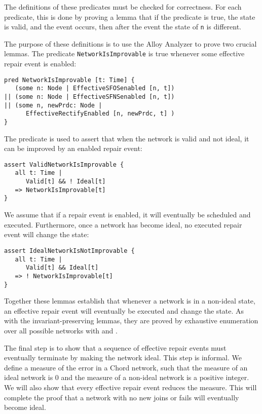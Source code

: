 \documentclass[conference]{IEEEtran}
\begin{document}
The definitions of these predicates must be checked for correctness.
For each predicate, this is done by proving a lemma that if the
predicate is true, the state is valid, and the event occurs, then
after the event the state of {\tt n} is different.

The purpose of these definitions is to use the Alloy Analyzer to
prove two crucial lemmas.
The predicate 
\small
{\tt NetworkIsImprovable}
\normalsize
is true whenever some effective
repair event is enabled:
\small
\begin{verbatim}
pred NetworkIsImprovable [t: Time] {
   (some n: Node | EffectiveSFOSenabled [n, t])
|| (some n: Node | EffectiveSFNSenabled [n, t])
|| (some n, newPrdc: Node | 
      EffectiveRectifyEnabled [n, newPrdc, t] )
}
\end{verbatim}
\normalsize
The predicate is used to assert that when the network is valid and not
ideal, it can be improved by an enabled repair event:
\small
\begin{verbatim}
assert ValidNetworkIsImprovable {
   all t: Time | 
      Valid[t] && ! Ideal[t] 
   => NetworkIsImprovable[t]  
}
\end{verbatim}
\normalsize
We assume that if a repair event is enabled, it will eventually be
scheduled and executed.  Furthermore, once a network has become ideal,
no executed repair event will change the state:
\small
\begin{verbatim}
assert IdealNetworkIsNotImprovable {
   all t: Time | 
      Valid[t] && Ideal[t] 
   => ! NetworkIsImprovable[t]  
}
\end{verbatim}
\normalsize
Together these lemmas establish that whenever a network is in a
non-ideal state, an effective repair event will eventually be executed
and change the state.
As with the invariant-preserving lemmas, they are proved by
exhaustive enumeration over all possible networks with
 and .

The final step is to show that a sequence of effective repair events
must eventually terminate by making the network ideal. 
This step is informal.
We define a measure of the error in a Chord network, such that the 
measure of an ideal network is 0 and the measure of a non-ideal network
is a positive integer.
We will also show that
every effective repair event reduces the measure.
This will complete the proof
that a network with no new joins or fails will eventually
become ideal.
\end{document}
